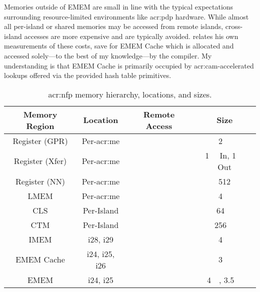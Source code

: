 Memories outside of EMEM are small in line with the typical expectations surrounding resource-limited environments like \gls{acr:pdp} hardware.
While almost all per-island or shared memories may be accessed from remote islands, cross-island accesses are more expensive and are typically avoided.
\Textcite[p.~30]{langlet-ml-netronome} relates his own measurements of these costs, save for EMEM Cache which is allocated and accessed solely---to the best of my knowledge---by the compiler.
My understanding is that EMEM Cache is primarily occupied by \gls{acr:cam}-accelerated lookups offered via the provided hash table primitives.

\begin{table}
	\centering
	\caption[NFP memory hierarchy, locations, and sizes.]{\gls{acr:nfp} memory hierarchy, locations, and sizes.\label{tab:nfp-adx-mem}}
	\begin{tabular}{@{}cccc@{}}
		\toprule
		Memory Region & Location & Remote Access & Size \\
		\midrule
		Register (GPR) & Per-\gls{acr:me} & \xmark & \qty{2}{\kibi\byte} \\
		Register (Xfer) & Per-\gls{acr:me} & \cmark & \qty{1}{\kibi\byte} In, \qty{1}{\kibi\byte} Out \\
		Register (NN) & Per-\gls{acr:me} & \xmark & \qty{512}{\byte} \\
		LMEM & Per-\gls{acr:me} & \xmark & \qty{4}{\kibi\byte} \\
		CLS & Per-Island & \cmark & \qty{64}{\kibi\byte} \\
		CTM & Per-Island & \cmark & \qty{256}{\kibi\byte} \\
		IMEM & i28, i29 & \cmark & \qty{4}{\mebi\byte} \\
		EMEM Cache & i24, i25, i26 & \cmark& \qty{3}{\mebi\byte} \\
		EMEM & i24, i25 & \cmark & \qty{4}{\gibi\byte}, \qty{3.5}{\gibi\byte}\\
		\bottomrule
	\end{tabular}
\end{table}


